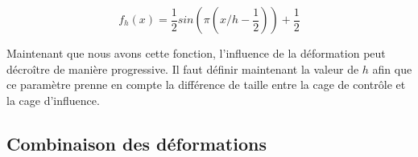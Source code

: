 \begin{equation}
  f_h(x) = \frac{1}{2} sin(\pi(x/h - \frac{1}{2})) + \frac{1}{2}
\end{equation}

Maintenant que nous avons cette fonction, l'influence de la déformation peut
décroître de manière progressive. Il faut définir maintenant la valeur de $h$
afin que ce paramètre prenne en compte la différence de taille entre la cage
de contrôle et la cage d'influence.

\subsection{Combinaison des déformations}